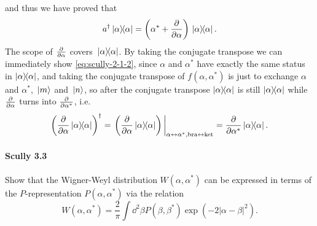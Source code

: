 \documentclass[hyperref, a4paper]{article}
\begin{document}
and thus we have proved that
\[
a^\dagger \dyad*{\alpha} = \left( \alpha^{*}+\frac{\partial}{\partial \alpha} \right) \dyad*{\alpha}.
\]
The scope of $\pdv{\alpha}$ covers $\dyad*{\alpha}$.
By taking the conjugate transpose we can immediately show \eqref{eq:scully-2-1-2}, since $\alpha$ and $\alpha^*$ have exactly the same status in $\dyad{\alpha}$, and taking the conjugate transpose of $f(\alpha, \alpha^*)$ is just to exchange $\alpha$ and $\alpha^*$, $\ket*{m}$ and $\ket*{n}$, so after the conjugate transpose $\dyad{\alpha}$ is still $\dyad{\alpha}$ while $\pdv{\alpha}$ turns into $\pdv{\alpha^*}$, i.e.
\[
    \left(\pdv{\alpha} \dyad{\alpha} \right)^\dagger = \eval{\left(\pdv{\alpha} \dyad{\alpha} \right)}_{\alpha \leftrightarrow \alpha^*, \text{bra} \leftrightarrow \text{ket}} = \pdv{\alpha^*} \dyad*{\alpha}.
\]

\paragraph{Scully 3.3} Show that the Wigner-Weyl distribution $W\left(\alpha, \alpha^{*}\right)$ can be expressed in terms of the $P$-representation $P\left(\alpha, \alpha^{*}\right)$ via the relation
\begin{equation}
    W\left(\alpha, \alpha^{*}\right)=\frac{2}{\pi} \int \dd^{2} \beta P\left(\beta, \beta^{*}\right) \exp \left(-2|\alpha-\beta|^{2}\right) .
    \label{eq:scully-3-3-1}
\end{equation}
\end{document}
